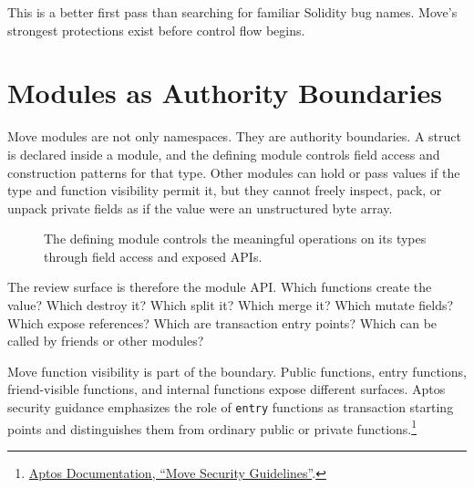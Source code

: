 This is a better first pass than searching for familiar Solidity bug names. Move's strongest protections exist before control flow begins.

\section{Modules as Authority Boundaries}

Move modules are not only namespaces. They are authority boundaries. A struct is declared inside a module, and the defining module controls field access and construction patterns for that type. Other modules can hold or pass values if the type and function visibility permit it, but they cannot freely inspect, pack, or unpack private fields as if the value were an unstructured byte array.

\begin{figure}[htbp]
\centering
{}
\caption{The defining module controls the meaningful operations on its types through field access and exposed APIs.}
\end{figure}

The review surface is therefore the module API. Which functions create the value? Which destroy it? Which split it? Which merge it? Which mutate fields? Which expose references? Which are transaction entry points? Which can be called by friends or other modules?

Move function visibility is part of the boundary. Public functions, entry functions, friend-visible functions, and internal functions expose different surfaces. Aptos security guidance emphasizes the role of \texttt{entry} functions as transaction starting points and distinguishes them from ordinary public or private functions.\footnote{\href{https://aptos.dev/build/smart-contracts/move-security-guidelines}{Aptos Documentation, ``Move Security Guidelines''}.}

